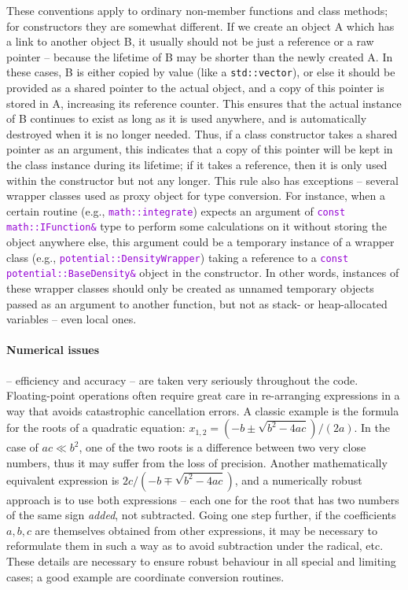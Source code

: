 \documentclass[12pt]{article}
\newcommand{\ttt}[1]{\textcolor{darkviolet}{\texttt{#1}}}
\let\oldparagraph\paragraph
\renewcommand{\paragraph}[1]{\vspace{-2mm}\oldparagraph{#1}}
\begin{document}
These conventions apply to ordinary non-member functions and class methods; for constructors they are somewhat different. If we create an object A which has a link to another object B, it usually should not be just a reference or a raw pointer -- because the lifetime of B may be shorter than the newly created A. In these cases, B is either copied by value (like a \texttt{std::vector}), or else it should be provided as a shared pointer to the actual object, and a copy of this pointer is stored in A, increasing its reference counter. This ensures that the actual instance of B continues to exist as long as it is used anywhere, and is automatically destroyed when it is no longer needed.
Thus, if a class constructor takes a shared pointer as an argument, this indicates that a copy of this pointer will be kept in the class instance during its lifetime; if it takes a reference, then it is only used within the constructor but not any longer.
This rule also has exceptions -- several wrapper classes used as proxy object for type conversion. For instance, when a certain routine (e.g., \ttt{math::integrate}) expects an argument of \ttt{const math::IFunction\&} type to perform some calculations on it without storing the object anywhere else, this argument could be a temporary instance of a wrapper class (e.g., \ttt{potential::DensityWrapper}) taking a reference to a \ttt{const potential::BaseDensity\&} object in the constructor. In other words, instances of these wrapper classes should only be created as unnamed temporary objects passed as an argument to another function, but not as stack- or heap-allocated variables -- even local ones.

\paragraph{Numerical issues} -- efficiency and accuracy -- are taken very seriously throughout the code. Floating-point operations often require great care in re-arranging expressions in a way that avoids catastrophic cancellation errors. A classic example is the formula for the roots of a quadratic equation: $x_{1,2} = (-b \pm\sqrt{b^2-4ac})/(2a)$. In the case of $ac\ll b^2$, one of the two roots is a difference between two very close numbers, thus it may suffer from the loss of precision. Another mathematically equivalent expression is $2c/(-b \mp\sqrt{b^2-4ac})$, and a numerically robust approach is to use both expressions -- each one for the root that has two numbers of the same sign \textit{added}, not subtracted. Going one step further, if the coefficients $a,b,c$ are themselves obtained from other expressions, it may be necessary to reformulate them in such a way as to avoid subtraction under the radical, etc. These details are necessary to ensure robust behaviour in all special and limiting cases; a good example are coordinate conversion routines.
\end{document}
